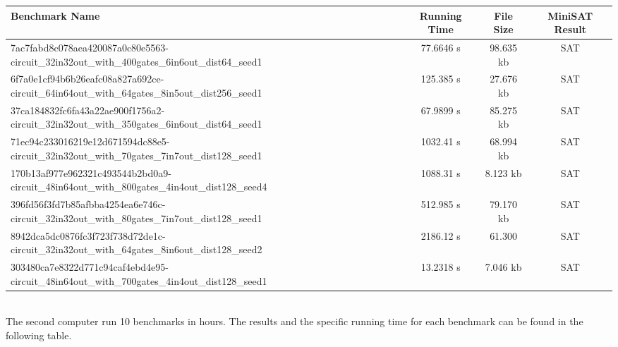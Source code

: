 \documentclass[runningheads]{llncs}
\begin{document}
\begin{adjustbox}{width=\textwidth,center}
\begin{tabular}{|p{16cm}|c|c|c|}
\hline
\textbf{Benchmark Name} & \textbf{Running Time} & \textbf{File Size} & \textbf{MiniSAT Result} \\ \hline
7ac7fabd8c078aea420087a0c80e5563-circuit\_32in32out\_with\_400gates\_6in6out\_dist64\_seed1 & 77.6646 s & 98.635 kb & SAT \\ \hline
6f7a0e1cf94b6b26eafc08a827a692ce-circuit\_64in64out\_with\_64gates\_8in5out\_dist256\_seed1 & 125.385 s & 27.676 kb & SAT \\ \hline
37ca184832fc6fa43a22ae900f1756a2-circuit\_32in32out\_with\_350gates\_6in6out\_dist64\_seed1 & 67.9899 s & 85.275 kb & SAT \\ \hline
71ec94c233016219e12d671594dc88e5-circuit\_32in32out\_with\_70gates\_7in7out\_dist128\_seed1 & 1032.41 s & 68.994 kb & SAT \\ \hline
170b13af977e962321c493544b2bd0a9-circuit\_48in64out\_with\_800gates\_4in4out\_dist128\_seed4 & 1088.31 s & 8.123 kb & SAT \\ \hline
396fd56f3fd7b85afbba4254ea6e746c-circuit\_32in32out\_with\_80gates\_7in7out\_dist128\_seed1 & 512.985 s & 79.170 kb & SAT \\ \hline
8942dca5dc0876fc3f723f738d72de1c-circuit\_32in32out\_with\_64gates\_8in6out\_dist128\_seed2 & 2186.12 s & 61.300 & SAT \\ \hline
303480ca7e8322d771c94caf4ebd4e95-circuit\_48in64out\_with\_700gates\_4in4out\_dist128\_seed1 & 13.2318 s & 7.046 kb & SAT \\ \hline
\end{tabular}
\end{adjustbox}
\\


The second computer run 10 benchmarks in hours. The results and the specific running time for each benchmark can be found in the following table. \\
\end{document}
